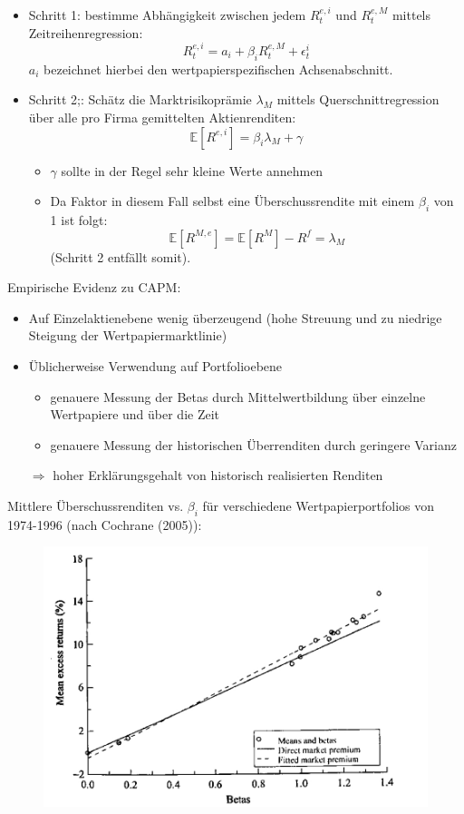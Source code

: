 \documentclass[12pt]{extreport} %
\theoremstyle{named}
\theoremstyle{nnamed}
\theoremstyle{itshape}
\theoremstyle{normal}
\begin{document}
\begin{itemize}
	\item Schritt 1: bestimme Abhängigkeit zwischen jedem $R_{t}^{e,i}$ und $R_t^{e,M}$ mittels Zeitreihenregression:
			$$ R_t^{e,i} = a_i + \beta_i R^{e,M}_t + \epsilon_t^i $$
			$a_i$ bezeichnet hierbei den wertpapierspezifischen Achsenabschnitt.
	\item Schritt 2;: Schätz die Marktrisikoprämie $\lambda_M$ mittels Querschnittregression über alle pro Firma gemittelten Aktienrenditen:
			$$ \mathbb{E}[R^{e,i}] = \beta_i \lambda_M + \gamma $$
		\begin{itemize}
			\item $\gamma$ sollte in der Regel sehr kleine Werte annehmen
			\item Da Faktor in diesem Fall selbst eine Überschussrendite mit einem $\beta_i$ von 1 ist folgt:
					$$ \mathbb{E}\left[ R^{M,e} \right] = \mathbb{E}\left[ R^M \right] - R^f = \lambda_M $$
					(Schritt 2 entfällt somit).
		\end{itemize}
\end{itemize}

Empirische Evidenz zu CAPM:
\begin{itemize}
	\item Auf Einzelaktienebene wenig überzeugend (hohe Streuung und zu niedrige Steigung der Wertpapiermarktlinie)
	\item Üblicherweise Verwendung auf Portfolioebene
		\begin{itemize}
			\item genauere Messung der Betas durch Mittelwertbildung über einzelne Wertpapiere und über die Zeit
			\item genauere Messung der historischen Überrenditen durch geringere Varianz
		\end{itemize}
		$\Rightarrow$ hoher Erklärungsgehalt von historisch realisierten Renditen
\end{itemize}

Mittlere Überschussrenditen vs. $\beta_i$ für verschiedene Wertpapierportfolios von 1974-1996 (nach Cochrane (2005)):

\begin{figure}[h!] \centering
	\includegraphics[scale=0.5]{img/p94}
\end{figure}
\end{document}
